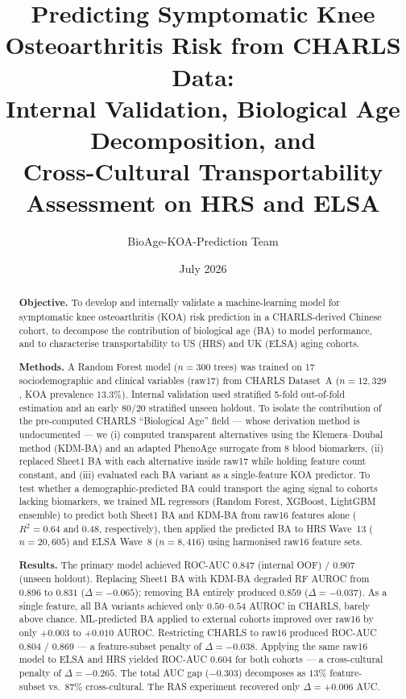 \documentclass[11pt,a4paper]{article}
\title{Predicting Symptomatic Knee Osteoarthritis Risk from CHARLS Data:\\
\large Internal Validation, Biological Age Decomposition, and\\
Cross-Cultural Transportability Assessment on HRS and ELSA}
\author{BioAge-KOA-Prediction Team}
\date{July 2026}
\begin{document}
\maketitle

\begin{abstract}
\textbf{Objective.} To develop and internally validate a machine-learning model for
symptomatic knee osteoarthritis (KOA) risk prediction in a CHARLS-derived Chinese cohort,
to decompose the contribution of biological age (BA) to model performance, and to
characterise transportability to US (HRS) and UK (ELSA) aging cohorts.

\textbf{Methods.} A Random Forest model ($n=300$ trees) was trained on 17
sociodemographic and clinical variables (raw17) from CHARLS Dataset~A
($n=12{,}329$, KOA prevalence $13.3\%$). Internal validation used stratified 5-fold
out-of-fold estimation and an early 80/20 stratified unseen holdout. To isolate the
contribution of the pre-computed CHARLS ``Biological Age'' field --- whose derivation
method is undocumented --- we (i) computed transparent alternatives using the
Klemera--Doubal method (KDM-BA) and an adapted PhenoAge surrogate from 8 blood
biomarkers, (ii) replaced Sheet1 BA with each alternative inside raw17 while holding
feature count constant, and (iii) evaluated each BA variant as a single-feature KOA
predictor. To test whether a demographic-predicted BA could transport the aging signal
to cohorts lacking biomarkers, we trained ML regressors (Random Forest, XGBoost,
LightGBM ensemble) to predict both Sheet1 BA and KDM-BA from raw16 features alone
($R^2=0.64$ and $0.48$, respectively), then applied the predicted BA to HRS Wave~13
($n=20{,}605$) and ELSA Wave~8 ($n=8{,}416$) using harmonised raw16 feature sets.

\textbf{Results.} The primary model achieved ROC-AUC $0.847$ (internal OOF) / $0.907$
(unseen holdout). Replacing Sheet1 BA with KDM-BA degraded RF AUROC from $0.896$ to
$0.831$ ($\Delta=-0.065$); removing BA entirely produced $0.859$ ($\Delta=-0.037$).
As a single feature, all BA variants achieved only $0.50$--$0.54$ AUROC in CHARLS,
barely above chance. ML-predicted BA applied to external cohorts improved over raw16 by
only $+0.003$ to $+0.010$ AUROC. Restricting CHARLS to raw16 produced ROC-AUC $0.804$ /
$0.869$ --- a feature-subset penalty of $\Delta=-0.038$. Applying the same raw16 model to
ELSA and HRS yielded ROC-AUC $0.604$ for both cohorts --- a cross-cultural penalty of
$\Delta=-0.265$. The total AUC gap ($-0.303$) decomposes as $13\%$ feature-subset vs.\
$87\%$ cross-cultural. The RAS experiment recovered only $\Delta=+0.006$ AUC.


\end{abstract}
\end{document}

